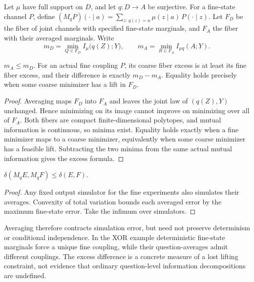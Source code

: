 
Let \(\mu\) have full support on \(D\), and let \(q:D\to A\) be surjective. For a fine-state channel \(P\), define \((M_qP)(\cdot\mid a)=\sum_{z:\,q(z)=a}\mu(z\mid a)\,P(\cdot\mid z)\). Let \(F_D\) be the fiber of joint channels with specified fine-state marginals, and \(F_A\) the fiber with their averaged marginals. Write
\[
m_D=\min_{Q\in F_D} I_\mu\big(q(Z);Y\big),\qquad
m_A=\min_{R\in F_A} I_{\mu q}(A;Y).
\]

\begin{thmplain}

\(m_A\le m_D\). For an actual fine coupling \(P\), its coarse fiber excess is at least its fine fiber excess, and their difference is exactly \(m_D-m_A\). Equality holds precisely when some coarse minimizer has a lift in \(F_D\).
\end{thmplain}

\begin{proof}

Averaging maps \(F_D\) into \(F_A\) and leaves the joint law of \((q(Z),Y)\) unchanged. Hence minimizing on its image cannot improve on minimizing over all of \(F_A\). Both fibers are compact finite-dimensional polytopes, and mutual information is continuous, so minima exist. Equality holds exactly when a fine minimizer maps to a coarse minimizer, equivalently when some coarse minimizer has a feasible lift. Subtracting the two minima from the same actual mutual information gives the excess formula.
\end{proof}

\begin{thmplain}

\(\delta(M_qE,M_qF)\le\delta(E,F)\).
\end{thmplain}

\begin{proof}

Any fixed output simulator for the fine experiments also simulates their averages. Convexity of total variation bounds each averaged error by the maximum fine-state error. Take the infimum over simulators.
\end{proof}

Averaging therefore contracts simulation error, but need not preserve determinism or conditional independence. In the XOR example deterministic fine-state marginals force a unique fine coupling, while their question-averages admit different couplings. The excess difference is a concrete measure of a lost lifting constraint, not evidence that ordinary question-level information decompositions are undefined.

